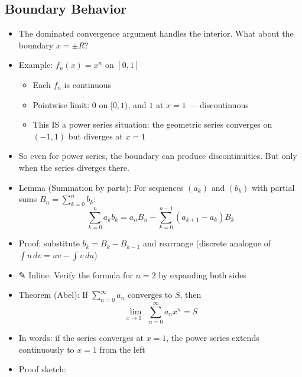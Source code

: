 \documentclass[
  10pt,
  letterpaper,
]{scrbook}
\providecommand{\tightlist}{%
  \setlength{\itemsep}{0pt}\setlength{\parskip}{0pt}}
\begin{document}
\subsection{Boundary Behavior}\label{boundary-behavior}

\begin{itemize}
\tightlist
\item
  The dominated convergence argument handles the interior. What about
  the boundary \(x = \pm R\)?
\item
  Example: \(f_n(x) = x^n\) on \([0, 1]\)

  \begin{itemize}
  \tightlist
  \item
    Each \(f_n\) is continuous
  \item
    Pointwise limit: \(0\) on \([0, 1)\), and \(1\) at \(x = 1\) ---
    discontinuous
  \item
    This IS a power series situation: the geometric series converges on
    \((-1, 1)\) but diverges at \(x = 1\)
  \end{itemize}
\item
  So even for power series, the boundary can produce discontinuities.
  But only when the series diverges there.
\item
  Lemma (Summation by parts): For sequences \((a_k)\) and \((b_k)\) with
  partial sums \(B_n = \sum_{k=0}^{n} b_k\):
  \[\sum_{k=0}^{n} a_k b_k = a_n B_n - \sum_{k=0}^{n-1} (a_{k+1} - a_k) B_k\]
\item
  Proof: substitute \(b_k = B_k - B_{k-1}\) and rearrange (discrete
  analogue of \(\int u \, dv = uv - \int v \, du\))
\item
  ✎ Inline: Verify the formula for \(n = 2\) by expanding both sides
\item
  Theorem (Abel): If \(\sum_{n=0}^{\infty} a_n\) converges to \(S\),
  then \[\lim_{x \to 1^-} \sum_{n=0}^{\infty} a_n x^n = S\]
\item
  In words: if the series converges at \(x = 1\), the power series
  extends continuously to \(x = 1\) from the left
\item
  Proof sketch:


\end{itemize}
\end{document}
